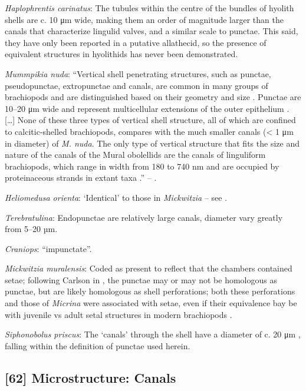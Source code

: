 \documentclass[openany]{book}
\theoremstyle{definition}
\theoremstyle{definition}
\theoremstyle{definition}
\theoremstyle{remark}
\begin{document}
\emph{Haplophrentis carinatus}: The tubules within the centre of the
bundles of hyolith shells \citep{Kouchinsky2000Skeletalmicrostructures}
are c. 10 μm wide, making them an order of magnitude larger than the
canals that characterize lingulid valves, and a similar scale to
punctae. This said, they have only been reported in a putative
allathecid, so the presence of equivalent structures in hyolithids has
never been demonstrated.

\emph{Mummpikia nuda}: ``Vertical shell penetrating structures, such as
punctae, pseudopunctae, extropunctae and canals, are common in many
groups of brachiopods and are distinguished based on their geometry and
size \citep{Williams1997BrachiopodaRevised}. Punctae are 10--20 μm wide
and represent multicellular extensions of the outer epithelium
\citep{Owen1969Thecaecum}. {[}\ldots{}{]} None of these three types of
vertical shell structure, all of which are confined to calcitic-shelled
brachiopods, compares with the much smaller canals (\textless{} 1 μm in
diameter) of \emph{M. nuda}. The only type of vertical structure that
fits the size and nature of the canals of the Mural obolellids are the
canals of linguliform brachiopods, which range in width from 180 to 740
nm and are occupied by proteinaceous strands in extant taxa
\citetext{\citealp[1994]{Williams1992Structureof}; \citealp{Williams1997BrachiopodaRevised}}.''
-- \citet{Balthasar2008iMummpikia}.

\emph{Heliomedusa orienta}: `Identical' to those in \emph{Mickwitzia} --
see \citet{Williams2007PartH}.

\emph{Terebratulina}: Endopunctae are relatively large canals, diameter
vary greatly from 5--20 µm.

\emph{Craniops}: ``impunctate''.

\emph{Mickwitzia muralensis}: Coded as present to reflect that the
chambers contained setae; following Carlson in
\citet{Williams2007PartH}, the punctae may or may not be homologous as
punctae, but are likely homologous as shell perforations; both these
perforations and those of \emph{Micrina} were associated with setae,
even if their equivalence bay be with juvenile vs adult setal structures
in modern brachiopods \citep[p.~397]{Balthasar2004Shellstructure}.

\emph{Siphonobolus priscus}: The `canals' through the shell have a
diameter of c. 20 μm \citep[text-fig. 2a]{Williams2004Chemicostructure},
falling within the definition of punctae used herein.

\hypertarget{microstructure-canals}{%
\subsection*{{[}62{]} Microstructure:
Canals}\label{microstructure-canals}}
\end{document}
